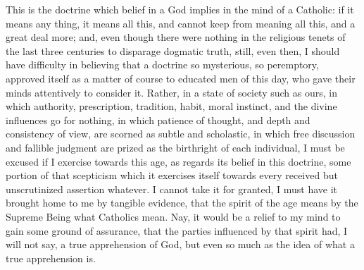 This is the doctrine which belief in a God implies in the mind of a
Catholic: if it means any thing, it means all this, and cannot keep
from meaning all this, and a great deal more; and, even though there
were nothing in the religious tenets of the last three centuries
to disparage dogmatic truth, still, even then, I should have
difficulty in believing that a doctrine so mysterious, so peremptory,
approved itself as a matter of course to educated men of this day, who
gave their minds attentively to consider it. Rather, in a state of
society such as ours, in which authority, prescription, tradition,
habit, moral instinct, and the divine influences go for nothing, in
which patience of thought, and depth and consistency of view, are
scorned as subtle and scholastic, in which free discussion and
fallible judgment are prized as the birthright of each individual, I
must be excused if I exercise towards this age, as regards its belief
in this doctrine, some portion of that scepticism which it exercises
itself towards every received but unscrutinized assertion whatever. I
cannot take it for granted, I must have it brought home to me by
tangible evidence, that the spirit of the age means by the Supreme
Being what Catholics mean. Nay, it would be a relief to my mind to
gain some ground of assurance, that the parties influenced by that
spirit had, I will not say, a true apprehension of God, but even so
much as the idea of what a true apprehension is.

